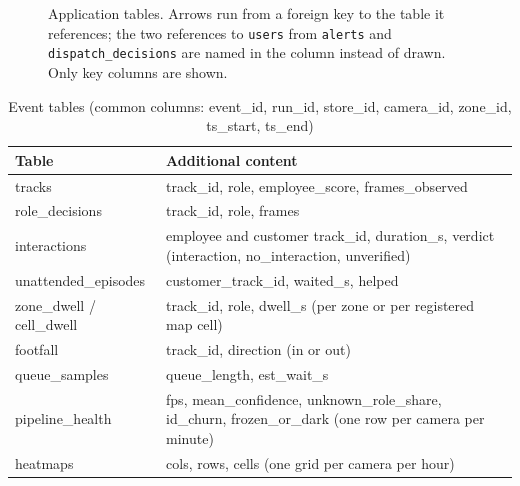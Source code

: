 \begin{figure}[htbp]
\caption[Application tables]{Application tables. Arrows run from a foreign key to the table it references; the two references to \texttt{users} from \texttt{alerts} and \texttt{dispatch\_decisions} are named in the column instead of drawn. Only key columns are shown.}
\label{fig:erd}
\end{figure}

\begin{table}[H]
\centering
\caption{Event tables (common columns: event\_id, run\_id, store\_id, camera\_id, zone\_id, ts\_start, ts\_end)}\label{tab:event-tables}
\begin{tabular}{P{0.24\textwidth}P{0.68\textwidth}}
\toprule
Table & Additional content\\
\midrule
tracks & track\_id, role, employee\_score, frames\_observed\\
role\_decisions & track\_id, role, frames\\
interactions & employee and customer track\_id, duration\_s, verdict (interaction, no\_interaction, unverified)\\
unattended\_episodes & customer\_track\_id, waited\_s, helped\\
zone\_dwell / cell\_dwell & track\_id, role, dwell\_s (per zone or per registered map cell)\\
footfall & track\_id, direction (in or out)\\
queue\_samples & queue\_length, est\_wait\_s\\
pipeline\_health & fps, mean\_confidence, unknown\_role\_share, id\_churn, frozen\_or\_dark (one row per camera per minute)\\
heatmaps & cols, rows, cells (one grid per camera per hour)\\
\bottomrule
\end{tabular}
\end{table}

